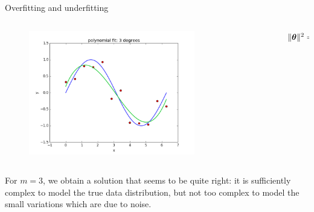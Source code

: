 \documentclass[xcolor=pdftex,dvipsnames,table]{beamer}
\begin{document}
\begin{frame}{Overfitting and underfitting}
\begin{columns}
\begin{column}{.8\textwidth}
\begin{figure}[htb]
	\includegraphics[width=0.75\textwidth]{../graphics/polyfit_degree_3.png}
\end{figure}
\end{column}
\begin{column}{.2\textwidth}
$\| \boldsymbol{\theta} \|^2 = 1.72$
\end{column}
\end{columns}
For $m=3$, we obtain a solution that seems to be quite right: it is sufficiently complex to model the true data distribution, but not too complex to model the small variations which are due to noise.
\end{frame}
\end{document}
